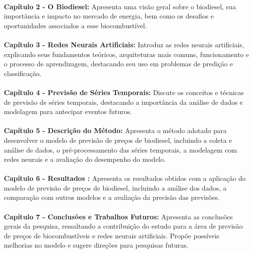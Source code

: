 \paragraph{} \textbf{Capítulo 2 - O Biodiesel: } Apresenta uma visão geral sobre o biodiesel, sua importância e impacto no mercado de energia, bem como os desafios e oportunidades associados a esse biocombustível.
\paragraph{} \textbf{Capítulo 3 - Redes Neurais Artificiais: } Introduz as redes neurais artificiais, explicando seus fundamentos teóricos, arquiteturas mais comuns, funcionamento e o processo de aprendizagem, destacando seu uso em problemas de predição e classificação.
\paragraph{} \textbf{Capítulo 4 - Previsão de Séries Temporais: } Discute os conceitos e técnicas de previsão de séries temporais, destacando a importância da análise de dados e modelagem para antecipar eventos futuros.
\paragraph{} \textbf{Capítulo 5 - Descrição do Método: } Apresenta o método adotado para desenvolver o modelo de previsão de preços de biodiesel, incluindo a coleta e análise de dados, o pré-processamento das séries temporais, a modelagem com redes neurais e a avaliação do desempenho do modelo.
\paragraph{} \textbf{Capítulo 6 - Resultados : } Apresenta os resultados obtidos com a aplicação do modelo de previsão de preços de biodiesel, incluindo a análise dos dados, a comparação com outros modelos e a avaliação da precisão das previsões.
\paragraph{} \textbf{Capítulo 7 - Conclusões e Trabalhos Futuros: } Apresenta as conclusões gerais da pesquisa, ressaltando a contribuição do estudo para a área de previsão de preços de biocombustíveis e redes neurais artificiais. Propõe possíveis melhorias no modelo e sugere direções para pesquisas futuras.
